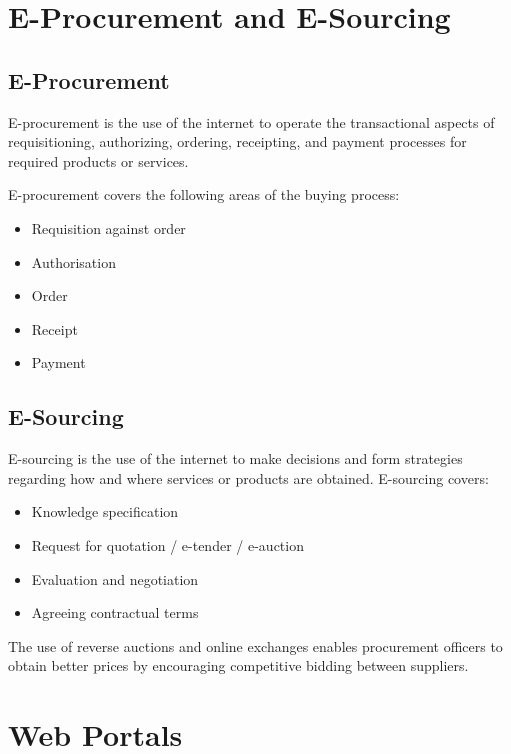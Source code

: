\documentclass[12pt,a4paper]{article}
\begin{document}
\section{E-Procurement and E-Sourcing}

\subsection{E-Procurement}
E-procurement is the use of the internet to operate the transactional aspects of requisitioning, authorizing, ordering, receipting, and payment processes for required products or services.

E-procurement covers the following areas of the buying process:
\begin{itemize}
    \item Requisition against order
    \item Authorisation
    \item Order
    \item Receipt
    \item Payment
\end{itemize}

\subsection{E-Sourcing}
E-sourcing is the use of the internet to make decisions and form strategies regarding how and where services or products are obtained. E-sourcing covers:
\begin{itemize}
    \item Knowledge specification
    \item Request for quotation / e-tender / e-auction
    \item Evaluation and negotiation
    \item Agreeing contractual terms
\end{itemize}

The use of reverse auctions and online exchanges enables procurement officers to obtain better prices by encouraging competitive bidding between suppliers.

\section{Web Portals}
\end{document}
